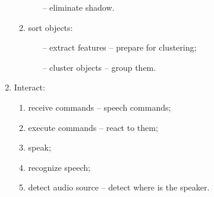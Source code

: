 \begin{enumerate}[topsep=2pt, partopsep=0pt,itemsep=0pt,parsep=1pt]
\begin{enumerate}[topsep=1pt, partopsep=0pt,itemsep=0pt,parsep=1pt]
\begin{itemize}[topsep=1pt, partopsep=0pt,itemsep=0pt,parsep=1pt]
                                \item[--] eliminate shadow.
                            \end{itemize}
                        \item sort objects:
                            \begin{itemize}[topsep=1pt, partopsep=0pt,itemsep=0pt,parsep=1pt]
                                \item[--] extract features -- prepare for clustering;
                                \item[--] cluster objects -- group them.
                            \end{itemize}
                    \end{enumerate}
                \item Interact:
                    \begin{enumerate}[topsep=1pt, partopsep=0pt,itemsep=0pt,parsep=1pt]
                        \item receive commands -- speech commands;
                        \item execute commands -- react to them;
                        \item speak;
                        \item recognize speech;
                        \item detect audio source -- detect where is the speaker.
                    \end{enumerate}
            \end{enumerate}
